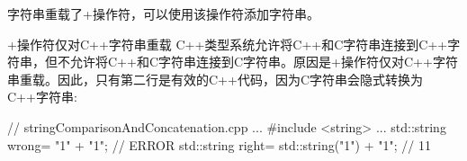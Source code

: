 字符串重载了+操作符，可以使用该操作符添加字符串。

\begin{myWarning}{+操作符仅对C++字符串重载}
C++类型系统允许将C++和C字符串连接到C++字符串，但不允许将C++和C字符串连接到C字符串。原因是+操作符仅对C++字符串重载。因此，只有第二行是有效的C++代码，因为C字符串会隐式转换为C++字符串:
	

\begin{cpp}
// stringComparisonAndConcatenation.cpp
...
#include <string>
...
std::string wrong= "1" + "1"; // ERROR
std::string right= std::string("1") + "1"; // 11
\end{cpp}
\end{myWarning}








